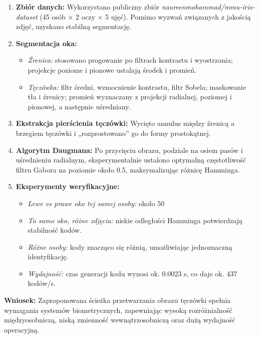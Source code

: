 \documentclass[a4paper]{article}
\begin{document}
\begin{enumerate}
    \item \textbf{Zbiór danych:}  
          Wykorzystano publiczny zbiór \emph{naureenmohammad/mmu-iris-dataset} (45 osób × 2 oczy × 5 ujęć). Pomimo wyzwań związanych z jakością zdjęć, uzyskano stabilną segmentację.
    \item \textbf{Segmentacja oka:}  
          \begin{itemize}
              \item \emph{Źrenica:} stosowano progowanie po filtrach kontrastu i wyostrzania; projekcje poziome i pionowe ustalają środek i promień.
              \item \emph{Tęczówka:} filtr średni, wzmocnienie kontrastu, filtr Sobela; maskowanie tła i źrenicy; promień wyznaczany z projekcji radialnej, poziomej i pionowej, a następnie uśredniany.
          \end{itemize}
    \item \textbf{Ekstrakcja pierścienia tęczówki:}  
          Wycięto annulus między źrenicą a brzegiem tęczówki i „rozprostowano” go do formy prostokątnej.
    \item \textbf{Algorytm Daugmana:}  
          Po przycięciu obrazu, podziale na osiem pasów i uśrednieniu radialnym, eksperymentalnie ustalono optymalną częstotliwość filtru Gabora na poziomie około 0.5, maksymalizując różnicę Hamminga.
    \item \textbf{Eksperymenty weryfikacyjne:}  
          \begin{itemize}
              \item \textit{Lewe vs prawe oko tej samej osoby:} około 50
              \item \textit{To samo oko, różne zdjęcia:} niskie odległości Hamminga potwierdzają stabilność kodów.
              \item \textit{Różne osoby:} kody znacząco się różnią, umożliwiając jednoznaczną identyfikację.
              \item \textit{Wydajność:} czas generacji kodu wynosi ok. 0.0023 s, co daje ok. 437 kodów/s.
          \end{itemize}
\end{enumerate}

\textbf{Wniosek:} Zaproponowana ścieżka przetwarzania obrazu tęczówki spełnia wymagania systemów biometrycznych, zapewniając wysoką rozróżnialność międzyosobniczą, niską zmienność wewnątrzosobniczą oraz dużą wydajność operacyjną.
\end{document}
